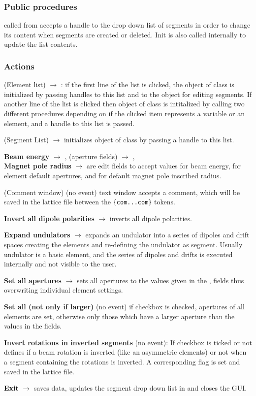 \documentclass[12pt]{article}
\newcommand\code[1]{{\tt #1}}
\newcommand{\ofld}[1]{\colorbox{black!15}{{{\color{black}\bf #1}}}}
\newcommand{\ofldx}[1]{\colorbox{black!15}{{\color{black}(#1)}}}
\newcommand\guico[1]{{\color{blue}\code{#1}}}
\newcommand{\unico}[1]{{\color{burntorange}\code{#1}}}
\newcommand{\evcod}[2]{\ofld{#1} $\rightarrow$ \guico{#2}}
\newcommand{\evcodx}[2]{\ofldx{#1} $\rightarrow$ \guico{#2}}
\newcommand{\opagui}[1]{\colorbox{blue!20}{{\color{black}\code{#1}}}}
\newcommand{\ogui}[1]{\hyperref[#1]{\opagui{#1}}}
\newcommand{\act}[1]{\subsubsection*{Actions} #1}
\newcommand{\ppro}[1]{\subsubsection*{Public procedures} #1}
\begin{document}
\ppro{
\guico{Init} called from \ogui{opamenu} accepts a handle to the drop down list of segments in order to change its content when segments are created or deleted. Init is also called internally to update the list contents.
}

\act{
\evcodx{Element list}{ListBoxEClick}: if the first line of the list is clicked, the object \guico{EditElemCreate} of class \ogui{oelecreate} is initialized by passing handles to this list and to the \ogui{osegedit} object for editing segments. If another line of the list is clicked then object \guico{EditElemSet} of class \ogui{oeleedit} is intitalized by calling two different procedures depending on if the clicked item represents a variable or an element, and a handle to this list is passed.

\evcodx{Segment List}{ListBoxSClick} initializes object \guico{EditSegSet} of class \ogui{osegedit} by passing a handle to this list.

\evcod{Beam energy}{EditGloEKeyPress}, \evcodx{aperture fields}{EditA*KeyPress},\\ \evcod{Magnet pole radius}{EdrrefKeyPress} are edit fields to accept values for beam energy, for element default apertures, and for default magnet pole inscribed radius.

\ofldx{Comment window} (no event) text window \guico{MemCom} accepts a comment, which will be saved in the lattice file between the \code{\{com...com\}} tokens.

\evcod{Invert all dipole polarities}{ButDipInv} inverts all dipole polarities.

\evcod{Expand undulators}{ButExpUndClick} expands an undulator into a series of dipoles and drift spaces creating the elements and re-defining the undulator as segment. Usually undulator is a basic element, and the series of dipoles and drifts is executed internally and not visible to the user.

\evcod{Set all apertures}{ButAllAperClick} sets all apertures to the values given in the \guico{EditAx}, \guico{EditAy} fields thus overwriting individual element settings. 

\ofld{Set all (not only if larger)} (no event) if checkbox \guico{ChkAll} is checked, apertures of all elements are set, otherwise only those which have a larger aperture than the values in the fields.

\ofld{Invert rotations in inverted segments} (no event): If  checkbox \guico{ChkGloRi} is ticked or not defines if a beam rotation is inverted (like an asymmetric elements) or not when a segment containing the rotations is  inverted. A corresponding flag \unico{glob.rot\_inv} is set and saved in the lattice file.

\evcod{Exit}{ButExit} saves data, updates the segment drop down list in \ogui{opamenu} and closes the GUI.
}
\end{document}
